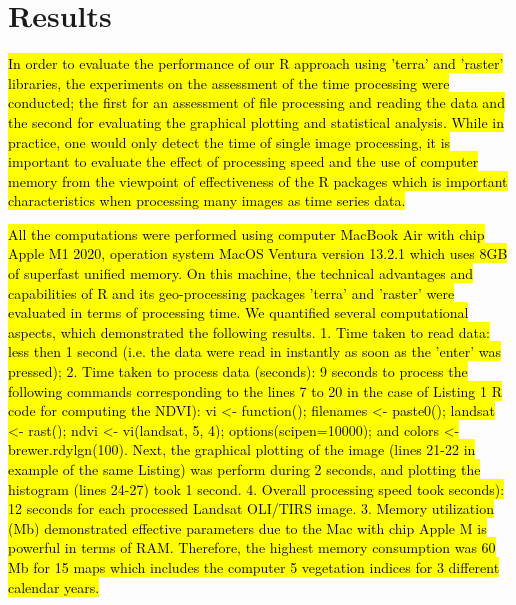\documentclass[jimaging,article,submit,pdftex,moreauthors]{Definitions/mdpi}
\begin{document}
\section{Results}

\hl{In order to evaluate the performance of our R approach using 'terra' and 'raster' libraries, the experiments on the assessment of the time processing were conducted; the first for an assessment of file processing and reading the data and the second for evaluating the graphical plotting and statistical analysis. While in practice, one would only detect the time of single image processing, it is important to evaluate the effect of processing speed and the use of computer memory from the viewpoint of effectiveness of the R packages which is important characteristics when processing many images as time series data.} 

\hl{All the computations were performed using computer MacBook Air with chip Apple M1 2020, operation system MacOS Ventura version 13.2.1 which uses 8GB of superfast unified memory. On this machine, the technical advantages and capabilities of R and its geo-processing packages 'terra' and 'raster' were evaluated in terms of processing time. We quantified several computational aspects, which demonstrated the following results. 1. Time taken to read data: less then 1 second (i.e. the data were read in instantly as soon as the 'enter' was pressed); 2. Time taken to process data (seconds): 9 seconds to process the following commands corresponding to the lines 7 to 20 in the case of Listing 1 R code for computing the NDVI): vi <- function(); filenames <- paste0(); landsat <- rast(); ndvi <- vi(landsat, 5, 4); options(scipen=10000); and colors <- brewer.rdylgn(100). Next, the graphical plotting of the image (lines 21-22 in example of the same Listing) was perform during 2 seconds, and plotting the histogram (lines 24-27) took 1 second. 4. Overall processing speed took seconds): 12 seconds for each processed Landsat OLI/TIRS image. 3. Memory utilization (Mb) demonstrated effective parameters due to the Mac with chip Apple M is powerful in terms of RAM. Therefore, the highest memory consumption was 60 Mb for 15 maps which includes the computer 5 vegetation indices for 3 different calendar years.}
\end{document}
